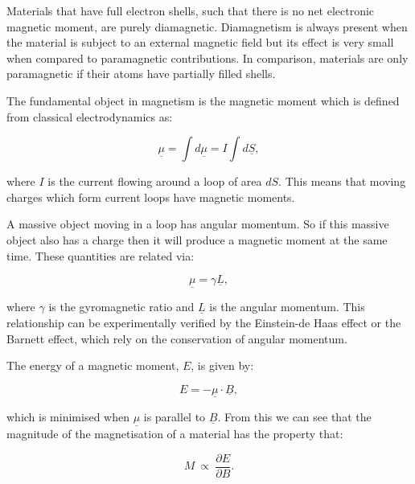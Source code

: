 \noindent Materials that have full electron shells, such that there is no net electronic magnetic moment, are purely diamagnetic. Diamagnetism is always present when the material is subject to an external magnetic field but its effect is very small when compared to paramagnetic contributions. In comparison, materials are only paramagnetic if their atoms have partially filled shells.

\noindent The fundamental object in magnetism is the magnetic moment which is defined from classical electrodynamics as:

\begin{equation}
    \underline{\mu} = \int d \underline{\mu} = I \int d\underline{S},
    \label{MagneticMoment}
\end{equation}

\noindent where $I$ is the current flowing around a loop of area $dS$. This means that moving charges which form current loops have magnetic moments.

\noindent A massive object moving in a loop has angular momentum. So if this massive object also has a charge then it will produce a magnetic moment at the same time. These quantities are related via:

\begin{equation}
    \underline{\mu} = \gamma \underline{L}
    \label{MagneticMomentAngularMomentumRelationship},
\end{equation}

\noindent where $\gamma$ is the gyromagnetic ratio and $\underline{L}$ is the angular momentum. This relationship can be experimentally verified by the Einstein-de Haas effect or the Barnett effect, which rely on the conservation of angular momentum.

\noindent The energy of a magnetic moment, $E$, is given by:

\begin{equation}
    E = - \underline{\mu} \cdot \underline{B},
    \label{EnergyMagneticMoment}
\end{equation}

\noindent which is minimised when $\underline{\mu}$ is parallel to $\underline{B}$. From this we can see that the magnitude of the magnetisation of a material has the property that:

\begin{equation}
    M ~ \propto ~ \frac{\partial E}{\partial B}.
    \label{MagnetisationFromEnergy}
\end{equation}

